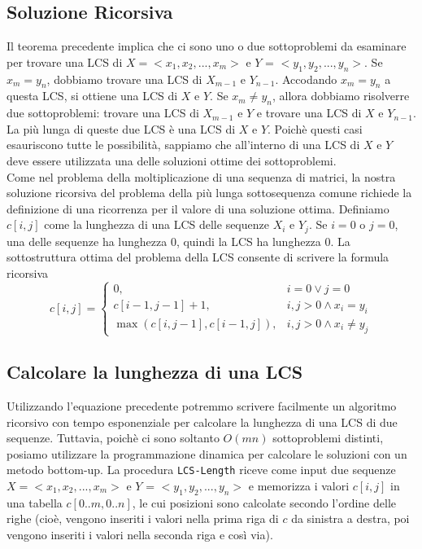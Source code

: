 \subsection{Soluzione Ricorsiva}

Il teorema precedente implica che ci sono uno o due sottoproblemi da
esaminare per trovare una LCS di $X = <x_1, x_2, ..., x_m>$ e $Y$ =
$<y_1, y_2, ..., y_n>$. Se $x_m = y_n$, dobbiamo trovare una LCS di
$X_{m-1}$ e $Y_{n-1}$. Accodando $x_m = y_n$ a questa LCS, si
ottiene una LCS di $X$ e $Y$. Se $x_m \neq y_n$, allora dobbiamo
risolverre due sottoproblemi: trovare una LCS di $X_{m-1}$ e $Y$ e
trovare una LCS di $X$ e $Y_{n-1}$. La più lunga di queste due LCS è
una LCS di $X$ e $Y$. Poichè questi casi esauriscono tutte le
possibilità, sappiamo che all'interno di una LCS di $X$ e $Y$ deve
essere utilizzata una delle soluzioni ottime dei sottoproblemi.\\

Come nel problema della moltiplicazione di una sequenza di matrici, la
nostra soluzione ricorsiva del problema della più lunga sottosequenza
comune richiede la definizione di una ricorrenza per il valore di una
soluzione ottima. Definiamo $c[i,j]$ come la lunghezza di una LCS
delle sequenze $X_i$ e $Y_j$. Se $i = 0$ o $j = 0$, una delle
sequenze ha lunghezza 0, quindi la LCS ha lunghezza 0. La sottostruttura
ottima del problema della LCS consente di scrivere la formula ricorsiva\\

$$
	c[i,j]= \begin{cases}
		0,                          & i = 0 \vee j = 0            \\
		c[i-1, j-1] + 1,            & i, j > 0 \wedge x_i = y_i   \\
		\max(c[i, j-1], c[i-1, j]), & i,j > 0 \wedge x_i \neq y_j
	\end{cases}
$$

\subsection{Calcolare la lunghezza di una LCS}

Utilizzando l'equazione precedente potremmo scrivere facilmente un
algoritmo ricorsivo con tempo esponenziale per calcolare la lunghezza di
una LCS di due sequenze. Tuttavia, poichè ci sono soltanto $O(mn)$
sottoproblemi distinti, posiamo utilizzare la programmazione dinamica
per calcolare le soluzioni con un metodo bottom-up. La procedura
\texttt{LCS-Length} riceve come input due sequenze
$X = <x_1, x_2, ..., x_m>$ e $Y$ = $<y_1, y_2, ..., y_n>$ e
memorizza i valori $c[i,j]$ in una tabella $c[0..m, 0..n]$, le cui
posizioni sono calcolate secondo l'ordine delle righe (cioè, vengono
inseriti i valori nella prima riga di $c$ da sinistra a destra, poi
vengono inseriti i valori nella seconda riga e così via).\\

